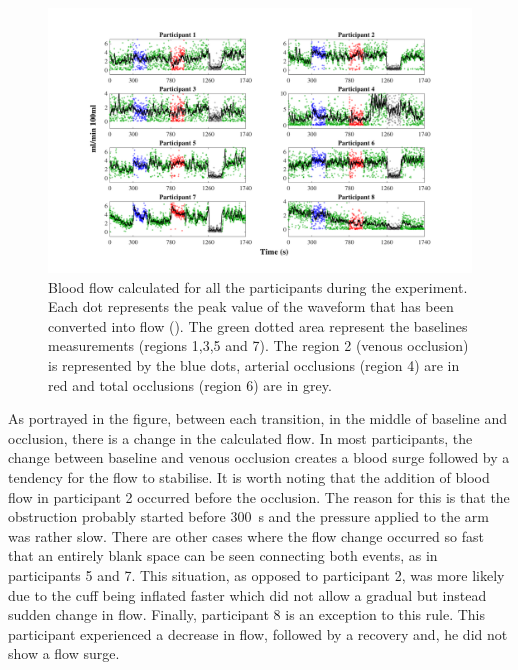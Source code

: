 \begin{figure}[!htb]
	\includegraphics[width=\textwidth,keepaspectratio,trim={3cm 0cm 3cm 0 cm},clip]{figure15}    
	\caption[Blood flow calculated from impedance plethysmography waveform at the time of the whole expetiment]{Blood flow calculated for all the participants during the experiment. Each dot represents the peak value of the waveform that has been converted into flow (\si{\bfv}). The green dotted area represent the baselines measurements (regions 1,3,5 and 7). The region 2 (venous occlusion) is represented by the blue dots, arterial occlusions (region 4) are in red and total occlusions (region 6) are in grey.}
	\label{fig:blood_flow_plethysmography}
\end{figure}

As portrayed in the figure, between each transition, in the middle of baseline and occlusion, there is a change in the calculated flow. In most participants, the change between baseline and venous occlusion creates a blood surge followed by a tendency for the flow to stabilise. It is worth noting that the addition of blood flow in participant 2 occurred before the occlusion. The reason for this is that the obstruction probably started before \SI{300}{\second} and the pressure applied to the arm was rather slow. There are other cases where the flow change occurred so fast that an entirely blank space can be seen connecting both events, as in participants 5 and 7. This situation, as opposed to participant 2, was more likely due to the cuff being inflated faster which did not allow a gradual but instead sudden change in flow. Finally, participant 8 is an exception to this rule. This participant experienced a decrease in flow, followed by a recovery and, he did not show a flow surge.

